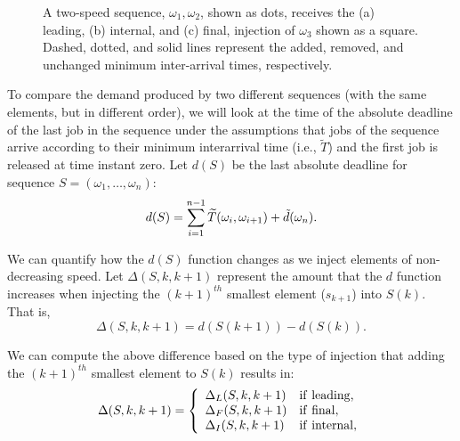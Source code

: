 \begin{figure}
      \label{fig:injFEI}
  \label{injFEI}
\caption{A two-speed sequence, $\omega_1, \omega_2$, shown as dots, receives the (a) leading, (b) internal, and (c) final, injection of $\omega_3$ shown as a square. Dashed, dotted, and solid lines represent the added, removed, and unchanged minimum inter-arrival times, respectively.}
\label{fig:injections}
\end{figure}

To compare the demand produced by two different sequences (with the same elements, but in different order), we will look at the time of the absolute deadline of the last job in the sequence under the assumptions that jobs of the sequence arrive according to their minimum interarrival time (i.e., $\widetilde{T}$) and the first job is released at time instant zero.   Let $d(S)$ be the last absolute deadline for sequence $S = (\omega_1, \ldots, \omega_n)$:
\begin{equation} \label{eq:speedSequenceTimeImplicitDeadline}
d(S) = \sum\limits_{i=1}^{n-1} \widetilde{T}(\omega_i,\omega_{i+1}) + \Tilde{d}(\omega_n).
\end{equation}

We can quantify how the $d(S)$ function changes as we inject elements of non-decreasing speed.  Let $\Delta(S, k, k+1)$ represent the amount that the $d$ function increases when injecting the $(k+1)^{th}$ smallest element ($s_{k+1}$) into $S(k)$.  That is,
\begin{equation} \label{eq:seq-delta}
\Delta(S, k, k+1) = d(S(k+1)) - d(S(k)).
\end{equation}

We can compute the above difference based on the type of injection that adding the $(k+1)^{th}$ smallest element to $S(k)$ results in:
\begin{equation} \label{eq:seq-delta-types}
\Delta(S, k, k+1) = \left\{
    \begin{array}{ll}
         \Delta_L (S, k, k+1)&{\rm if~leading},  \\
         \Delta_F (S, k, k+1)&{\rm if~final},\\
        \Delta_I (S, k, k+1)&{\rm if~internal},
    \end{array}
\right.
\end{equation}

